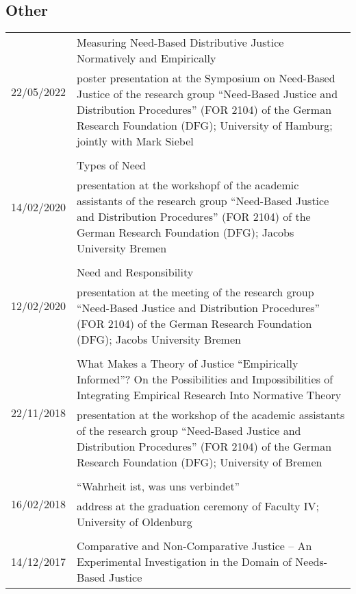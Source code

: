 \documentclass[a4paper,10pt]{article}
\begin{document}
\subsection*{Other}
\begin{longtable}{p{2.25cm}p{11cm}}
\multirow{2}{2.25cm}{\footnotesize{22/05/2022}} & Measuring Need-Based Distributive Justice Normatively and Empirically\\
& \footnotesize{poster presentation at the Symposium on Need-Based Justice of the research group \enquote{Need-Based Justice and Distribution Procedures} (FOR 2104) of the German Research Foundation (DFG); University of Hamburg; jointly with Mark Siebel}\\
\\
\multirow{2}{2.25cm}{\footnotesize{14/02/2020}} & Types of Need\\
& \footnotesize{presentation at the workshopf of the academic assistants of the research group \enquote{Need-Based Justice and Distribution Procedures} (FOR 2104) of the German Research Foundation (DFG); Jacobs University Bremen}\\
\\
\multirow{2}{2.25cm}{\footnotesize{12/02/2020}} & Need and Responsibility\\
& \footnotesize{presentation at the meeting of the research group \enquote{Need-Based Justice and Distribution Procedures} (FOR 2104) of the German Research Foundation (DFG); Jacobs University Bremen}\\
\\
\multirow{2}{2.25cm}{\footnotesize{22/11/2018}} & What Makes a Theory of Justice \enquote{Empirically Informed}? On the Possibilities and Impossibilities of Integrating Empirical Research Into Normative Theory\\
& \footnotesize{presentation at the workshop of the academic assistants of the research group \enquote{Need-Based Justice and Distribution Procedures} (FOR 2104) of the German Research Foundation (DFG); University of Bremen}\\
\\
\multirow{2}{2.25cm}{\footnotesize{16/02/2018}} & \enquote{Wahrheit ist, was uns verbindet}\\
& \footnotesize{address at the graduation ceremony of Faculty IV; University of Oldenburg}\\
\\
\multirow{2}{2.25cm}{\footnotesize{14/12/2017}} & Comparative and Non-Comparative Justice -- An Experimental Investigation in the Domain of Needs-Based Justice\\

\end{longtable}
\end{document}
